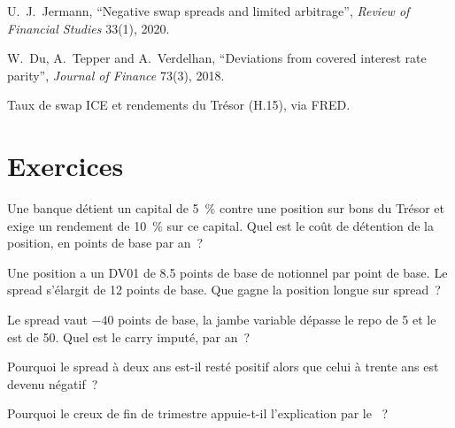 \begin{omsources}
\item U.~J.~Jermann, ``Negative swap spreads and limited arbitrage'', \emph{Review of Financial Studies} 33(1), 2020.
\item W.~Du, A.~Tepper and A.~Verdelhan, ``Deviations from covered interest rate parity'', \emph{Journal of Finance} 73(3), 2018.
\item Taux de swap ICE et rendements du Trésor (H.15), via FRED.
\end{omsources}

\section{Exercices}

\begin{exercise}[$\star$]\label{exo:s2:swap-spread-and-asset-swap-trades:1}
Une banque détient un capital de 5~\% contre une position sur bons du Trésor et exige un rendement de 10~\% sur ce capital. Quel est le coût de détention de la position, en points de base par an~?
\end{exercise}

\begin{exercise}[$\star$]\label{exo:s2:swap-spread-and-asset-swap-trades:2}
Une position a un DV01 de 8.5 points de base de notionnel par point de base. Le spread s'élargit de 12 points de base. Que gagne la position longue sur spread~?
\end{exercise}

\begin{exercise}[$\star$]\label{exo:s2:swap-spread-and-asset-swap-trades:3}
Le spread vaut $-40$ points de base, la jambe variable dépasse le repo de 5 et le  est de 50. Quel est le carry imputé, par an~?
\end{exercise}

\begin{exercise}[$\star\star$]\label{exo:s2:swap-spread-and-asset-swap-trades:4}
Pourquoi le spread à deux ans est-il resté positif alors que celui à trente ans est devenu négatif~?
\end{exercise}

\begin{exercise}[$\star\star$]\label{exo:s2:swap-spread-and-asset-swap-trades:5}
Pourquoi le creux de fin de trimestre appuie-t-il l'explication par le ~?
\end{exercise}


